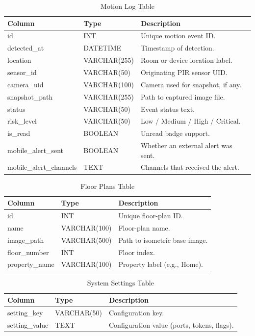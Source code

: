 \documentclass[12pt,a4paper]{report}
\begin{document}
\begin{table}[htbp]
\centering
\begin{tabular}{|p{5cm}|p{3cm}|p{6cm}|}
\hline
\textbf{Column} & \textbf{Type} & \textbf{Description} \\ \hline
id & INT & Unique motion event ID. \\ \hline
detected\_at & DATETIME & Timestamp of detection. \\ \hline
location & VARCHAR(255) & Room or device location label. \\ \hline
sensor\_id & VARCHAR(50) & Originating PIR sensor UID. \\ \hline
camera\_uid & VARCHAR(100) & Camera used for snapshot, if any. \\ \hline
snapshot\_path & VARCHAR(255) & Path to captured image file. \\ \hline
status & VARCHAR(50) & Event status text. \\ \hline
risk\_level & VARCHAR(50) & Low / Medium / High / Critical. \\ \hline
is\_read & BOOLEAN & Unread badge support. \\ \hline
mobile\_alert\_sent & BOOLEAN & Whether an external alert was sent. \\ \hline
mobile\_alert\_channels & TEXT & Channels that received the alert. \\ \hline
\end{tabular}
\caption{Motion Log Table}
\end{table}

\begin{table}[htbp]
\centering
\begin{tabular}{|p{5cm}|p{3cm}|p{6cm}|}
\hline
\textbf{Column} & \textbf{Type} & \textbf{Description} \\ \hline
id & INT & Unique floor-plan ID. \\ \hline
name & VARCHAR(100) & Floor-plan name. \\ \hline
image\_path & VARCHAR(500) & Path to isometric base image. \\ \hline
floor\_number & INT & Floor index. \\ \hline
property\_name & VARCHAR(100) & Property label (e.g., Home). \\ \hline
\end{tabular}
\caption{Floor Plans Table}
\end{table}

\begin{table}[htbp]
\centering
\begin{tabular}{|p{5cm}|p{3cm}|p{6cm}|}
\hline
\textbf{Column} & \textbf{Type} & \textbf{Description} \\ \hline
setting\_key & VARCHAR(50) & Configuration key. \\ \hline
setting\_value & TEXT & Configuration value (ports, tokens, flags). \\ \hline
\end{tabular}
\caption{System Settings Table}
\end{table}
\end{document}

